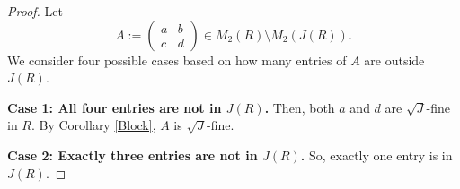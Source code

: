 \documentclass[12pt]{amsart}
\theoremstyle{definition}
\begin{document}
\begin{proof}
Let
	\[
	A := \begin{pmatrix} a & b \\ c & d \end{pmatrix} \in M_2(R) \setminus M_2(J(R)).
	\]
We consider four possible cases based on how many entries of \( A \) are outside \( J(R) \).

\medskip
	
\textbf{Case 1: All four entries are not in \( J(R) \).} Then, both \( a \) and \( d \) are $\sqrt{J}$-fine in \( R \). By Corollary \ref{Block}, \( A \) is $\sqrt{J}$-fine.

\medskip
	
\textbf{Case 2: Exactly three entries are not in \( J(R) \).} So, exactly one entry is in \( J(R) \).

\medskip
	

\end{proof}
\end{document}

